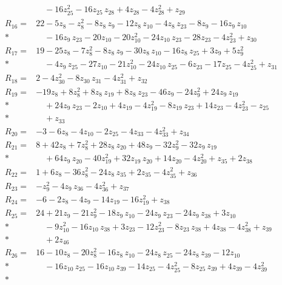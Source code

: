 \begin{align*}
&\quad  - 16z_{25}^{2} - 16z_{25}\,z_{28} + 4z_{28} - 4z_{28}^{2} + z_{29} \\[2pt]
R_{16}={}& 22 - 5z_{8} - z_{8}^{2} - 8z_{8}\,z_{9} - 12z_{8}\,z_{10} - 4z_{8}\,z_{23} - 8z_{9} - 16z_{9}\,z_{10} \\*
&\quad  - 16z_{9}\,z_{23} - 20z_{10} - 20z_{10}^{2} - 24z_{10}\,z_{23} - 28z_{23} - 4z_{23}^{2} + z_{30} \\[2pt]
R_{17}={}& 19 - 25z_{8} - 7z_{8}^{2} - 8z_{8}\,z_{9} - 30z_{8}\,z_{10} - 16z_{8}\,z_{25} + 3z_{9} + 5z_{9}^{2} \\*
&\quad  - 4z_{9}\,z_{25} - 27z_{10} - 21z_{10}^{2} - 24z_{10}\,z_{25} - 6z_{23} - 17z_{25} - 4z_{25}^{2} + z_{31} \\[2pt]
R_{18}={}& 2 - 4z_{30}^{2} - 8z_{30}\,z_{31} - 4z_{31}^{2} + z_{32} \\[2pt]
R_{19}={}& -19z_{8} + 8z_{8}^{2} + 8z_{8}\,z_{19} + 8z_{8}\,z_{23} - 46z_{9} - 24z_{9}^{2} + 24z_{9}\,z_{19} \\*
&\quad  + 24z_{9}\,z_{23} - 2z_{10} + 4z_{19} - 4z_{19}^{2} - 8z_{19}\,z_{23} + 14z_{23} - 4z_{23}^{2} - z_{25} \\*
&\quad  + z_{33} \\[2pt]
R_{20}={}& -3 - 6z_{8} - 4z_{10} - 2z_{25} - 4z_{33} - 4z_{33}^{2} + z_{34} \\[2pt]
R_{21}={}& 8 + 42z_{8} + 7z_{8}^{2} + 28z_{8}\,z_{20} + 48z_{9} - 32z_{9}^{2} - 32z_{9}\,z_{19} \\*
&\quad  + 64z_{9}\,z_{20} - 40z_{19}^{2} + 32z_{19}\,z_{20} + 14z_{20} - 4z_{20}^{2} + z_{35} + 2z_{38} \\[2pt]
R_{22}={}& 1 + 6z_{8} - 36z_{8}^{2} - 24z_{8}\,z_{35} + 2z_{35} - 4z_{35}^{2} + z_{36} \\[2pt]
R_{23}={}& -z_{9}^{2} - 4z_{9}\,z_{36} - 4z_{36}^{2} + z_{37} \\[2pt]
R_{24}={}& -6 - 2z_{8} - 4z_{9} - 14z_{19} - 16z_{19}^{2} + z_{38} \\[2pt]
R_{25}={}& 24 + 21z_{9} - 21z_{9}^{2} - 18z_{9}\,z_{10} - 24z_{9}\,z_{23} - 24z_{9}\,z_{38} + 3z_{10} \\*
&\quad  - 9z_{10}^{2} - 16z_{10}\,z_{38} + 3z_{23} - 12z_{23}^{2} - 8z_{23}\,z_{38} + 4z_{38} - 4z_{38}^{2} + z_{39} \\*
&\quad  + 2z_{46} \\[2pt]
R_{26}={}& 16 - 10z_{8} - 20z_{8}^{2} - 16z_{8}\,z_{10} - 24z_{8}\,z_{25} - 24z_{8}\,z_{39} - 12z_{10} \\*
&\quad  - 16z_{10}\,z_{25} - 16z_{10}\,z_{39} - 14z_{25} - 4z_{25}^{2} - 8z_{25}\,z_{39} + 4z_{39} - 4z_{39}^{2} \\*

\end{align*}
